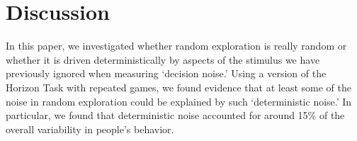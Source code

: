 \documentclass[12pt]{article}
\begin{document}




	
\section*{Discussion}
	
	
	
    In this paper, we investigated whether random exploration is really random or whether it is driven deterministically by aspects of the stimulus we have previously ignored when measuring `decision noise.'  Using a version of the Horizon Task with repeated games, we found evidence that at least some of the noise in random exploration could be explained by such `deterministic noise.' In particular, we found that deterministic noise accounted for around 15\% of the overall variability in people's behavior. 
	
\end{document}
